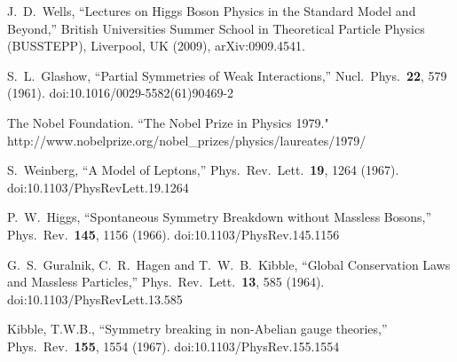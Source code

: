 \documentclass[letter,12pt]{article}
\begin{document}
\begin{thebibliography}{99}
  J.~D.~Wells,
  ``Lectures on Higgs Boson Physics in the Standard Model and Beyond,'' British Universities Summer School in Theoretical Particle Physics (BUSSTEPP), Liverpool, UK (2009),
  arXiv:0909.4541.

  S.~L.~Glashow,
  ``Partial Symmetries of Weak Interactions,''
  Nucl.\ Phys.\  {\bf 22}, 579 (1961).
  doi:10.1016/0029-5582(61)90469-2
  
  The Nobel Foundation. ``The Nobel Prize in Physics 1979." \\
  http://www.nobelprize.org/nobel\_prizes/physics/laureates/1979/
    
  S.~Weinberg,
  ``A Model of Leptons,''
  Phys.\ Rev.\ Lett.\  {\bf 19}, 1264 (1967).
  doi:10.1103/PhysRevLett.19.1264
  
  
      
  P.~W.~Higgs,
  ``Spontaneous Symmetry Breakdown without Massless Bosons,''
  Phys.\ Rev.\  {\bf 145}, 1156 (1966).
  doi:10.1103/PhysRev.145.1156

  
  G.~S.~Guralnik, C.~R.~Hagen and T.~W.~B.~Kibble,
  ``Global Conservation Laws and Massless Particles,''
  Phys.\ Rev.\ Lett.\  {\bf 13}, 585 (1964).
  doi:10.1103/PhysRevLett.13.585
  
 {Kibble, T.W.B.,
  ``Symmetry breaking in non-Abelian gauge theories,''
  Phys.\ Rev.\  {\bf 155}, 1554 (1967).
  doi:10.1103/PhysRev.155.1554}
    

\end{thebibliography}
\end{document}
